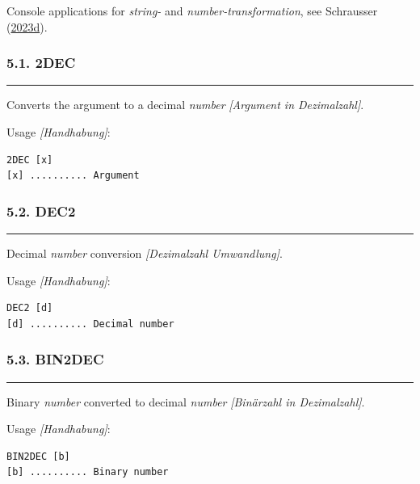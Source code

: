 \documentclass[
]{article}
\begin{document}
Console applications for \emph{string-} and
\emph{number-transformation}, see Schrausser
(\href{https://doi.org/10.5281/zenodo.7653790}{2023d}).

\hypertarget{dec}{%
\subsubsection{5.1. 2DEC}\label{dec}}

\begin{center}\rule{0.5\linewidth}{0.5pt}\end{center}

Converts the argument to a decimal \emph{number} \emph{{[}Argument in
Dezimalzahl{]}}.

Usage \emph{{[}Handhabung{]}}:

\begin{verbatim}
2DEC [x] 
[x] .......... Argument
\end{verbatim}

\hypertarget{dec2}{%
\subsubsection{5.2. DEC2}\label{dec2}}

\begin{center}\rule{0.5\linewidth}{0.5pt}\end{center}

Decimal \emph{number} conversion \emph{{[}Dezimalzahl Umwandlung{]}}.

Usage \emph{{[}Handhabung{]}}:

\begin{verbatim}
DEC2 [d]
[d] .......... Decimal number
\end{verbatim}

\hypertarget{bin2dec}{%
\subsubsection{5.3. BIN2DEC}\label{bin2dec}}

\begin{center}\rule{0.5\linewidth}{0.5pt}\end{center}

Binary \emph{number} converted to decimal \emph{number}
\emph{{[}Binärzahl in Dezimalzahl{]}}.

Usage \emph{{[}Handhabung{]}}:

\begin{verbatim}
BIN2DEC [b]
[b] .......... Binary number
\end{verbatim}
\end{document}
